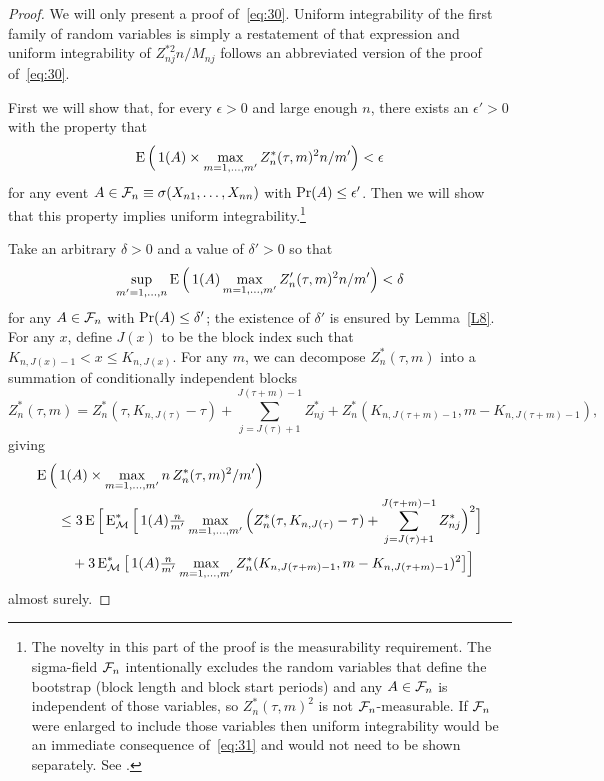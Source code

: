 \documentclass[11pt]{article}
\begin{document}
\begin{proof}
  We will only present a proof of~\eqref{eq:30}. Uniform integrability
  of the first family of random variables is simply a restatement of
  that expression and uniform integrability of $Z_{nj}^{*2} n / M_{nj}$
  follows an abbreviated version of the proof of~\eqref{eq:30}.

  First we will show that, for every $\epsilon > 0$ and large enough
  $n$, there exists an $\epsilon' > 0$ with the property that
  \begin{equation}\label{eq:31}
    \operatorname{E} \Big(\operatorname{1}(A) \times \max_{m = 1,\dots,m'} Z^*_n(\tau, m)^2 n / m'\Big) < \epsilon
  \end{equation}
  for any event $A \in \mathcal{F}_n \equiv \sigma(X_{n1},\dots,X_{nn})$ with
  $\operatorname{Pr}(A) \leq \epsilon'$. Then we will show that this property
  implies uniform integrability.\footnote{%
    The novelty in this part of the proof is the measurability
    requirement. The sigma-field $\mathcal{F}_n$ intentionally excludes the
    random variables that define the bootstrap (block length and block
    start periods) and any $A \in \mathcal{F}_n$ is independent of those
    variables, so $Z_n^{*}(\tau, m)^2$ is not $\mathcal{F}_n$-measurable. If
    $\mathcal{F}_n$ were enlarged to include those variables then uniform
    integrability would be an immediate consequence of~\eqref{eq:31}
    and would not need to be shown separately. See \citet[Theorem
    12.9]{Dav:94}.} %

  Take an arbitrary $\delta > 0$ and a value of $\delta' > 0$
  so that
  \begin{equation}\label{eq:35}
    \sup_{m'=1,\dots,n} \operatorname{E} \Big(\operatorname{1}(A) \max_{m = 1,\dots,m'}
    Z_n'(\tau, m)^2 n / m' \Big) < \delta
  \end{equation}
  for any $A \in \mathcal{F}_n$ with $\operatorname{Pr}(A) \leq \delta'$; the existence
  of $\delta'$ is ensured by Lemma~\ref{L8}. For any $x$,
  define $J(x)$ to be the block index such that $K_{n,J(x) - 1} < x
  \leq K_{n,J(x)}$. For any $m$, we can decompose $Z_n^{*}(\tau, m)$
  into a summation of conditionally independent blocks
  \begin{equation*}
  Z^{*}_n(\tau, m) = Z_n^*(\tau, K_{n,J(\tau)} - \tau) +
  \sum_{j=J(\tau)+1}^{J(\tau + m)-1} Z_{nj}^* + Z_n^*(K_{n,J(\tau+m)-1}, m - K_{n,J(\tau + m)-1}),
  \end{equation*}
  giving
  \begin{align}
  \operatorname{E}  \Big(&\operatorname{1}(A) \times \max_{m = 1,\dots,m'} n \, Z^*_n(\tau, m)^2 / m'\Big)
  \notag \\
  &\leq 3 \operatorname{E}\Big[ \operatorname{E}_{\mathcal{M}}^{*} \Big[\operatorname{1}(A) \tfrac{n}{m'}\max_{m = 1,\dots, m'}
  \Big(Z_n^*(\tau, K_{n,J(\tau)} - \tau) + \sum_{j=J(\tau)+1}^{J(\tau + m)-1} Z_{nj}^*\Big)^2\Big]
  \notag \\
  &\quad + 3 \operatorname{E}_{\mathcal{M}}^{*} \big[\operatorname{1}(A) \tfrac{n}{m'}
  \max_{m=1,\dots,m'} Z_n^*(K_{n,J(\tau+m)-1}, m - K_{n,J(\tau + m)-1})^2 \big]\Big]\label{eq:6}
  \end{align}
  almost surely.


\end{proof}
\end{document}
